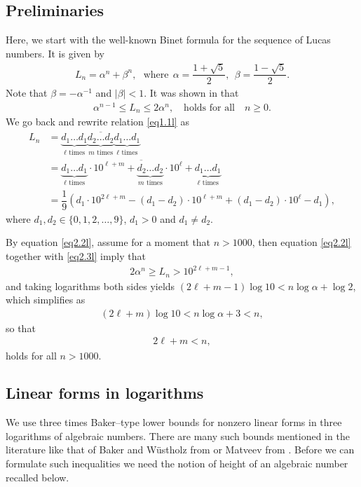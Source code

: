 \subsection{Preliminaries}
Here, we start with the well-known Binet formula for the sequence of Lucas numbers. It is given by
\begin{align}\label{eq2.1l}
	L_n = \alpha^n +\beta^n,~~~\text{where}~~\alpha=\dfrac{1+\sqrt{5}}{2}, ~~\beta=\dfrac{1-\sqrt{5}}{2}.
\end{align}
Note that $\beta=-\alpha^{-1}$ and $|\beta|<1$. It was shown in \cite{BRL} that 
\begin{align}\label{eq2.2l}
	\alpha^{n-1} \le L_n \le2\alpha^n, \quad \text{holds for all} \quad n\ge0.
\end{align}
We go back and rewrite relation \eqref{eq1.1l} as
\begin{align}\label{eq2.3l}
	L_n &= \overline{\underbrace{d_1 \ldots d_1}_{\ell \text{ times}}\underbrace{d_2 \ldots d_2}_{m \text{ times}}\underbrace{d_1 \ldots d_1}_{\ell \text{ times}}}\nonumber\\
	&=\overline{\underbrace{d_1 \ldots d_1}_{\ell \text{ times}}\cdot 10^{\ell+m}+\underbrace{d_2 \ldots d_2}_{m \text{ times}}\cdot 10^{\ell}+\underbrace{d_1 \ldots d_1}_{\ell \text{ times}}}\nonumber\\
	&=\dfrac{1}{9}\left(d_1\cdot 10^{2\ell+m}-(d_1-d_2)\cdot 10^{\ell+m} +(d_1-d_2)\cdot 10^{\ell}-d_1 \right),
\end{align} 
where \( d_1, d_2 \in \{0, 1, 2, \ldots, 9\}\), \( d_1 > 0 \) and \(d_1\ne d_2\).

By equation \eqref{eq2.2l}, assume for a moment that $n>1000$, then equation \eqref{eq2.2l} together with \eqref{eq2.3l} imply that
\begin{align*}
	2\alpha^n\ge L_n >10^{2\ell +m-1},
\end{align*}
and taking logarithms both sides yields $(2\ell+m-1)\log 10<n\log \alpha+\log 2$, which simplifies as
\begin{align*}
	(2\ell+m)\log 10<n\log \alpha+3<n,
\end{align*}
so that
\begin{align}\label{eq2.4l}
	2\ell+m<n,
\end{align}
holds for all $n>1000$.

\subsection{Linear forms in logarithms}
We use three times Baker--type lower bounds for nonzero linear forms in three logarithms of algebraic numbers. There are many such bounds mentioned in the literature like that of Baker and W{\"u}stholz from \cite{BW} or Matveev from \cite{matl}. Before we can formulate such inequalities we need the notion of height of an algebraic number recalled below.  


